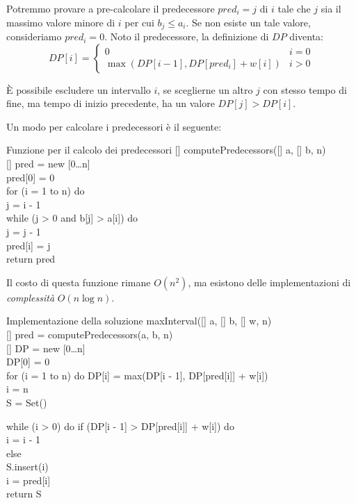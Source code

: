 Potremmo provare a pre-calcolare il predecessore $pred_i=j$ di $i$ tale che
$j$ sia il massimo valore minore di $i$ per cui $b_j\leq a_i$. Se non esiste un
tale valore, consideriamo $pred_i=0$. Noto il predecessore, la definizione di
$DP$ diventa:
\[DP[i]=\begin{cases}
    0 & i=0\\
    \max\left(DP[i-1],DP[pred_i]+w[i]\right) & i>0
\end{cases}\]
\begin{note}
    È possibile escludere un intervallo $i$, se sceglierne un altro $j$ con
    stesso tempo di fine, ma tempo di inizio precedente, ha un valore
    $DP[j]>DP[i]$.
\end{note}\noindent
Un modo per calcolare i predecessori è il seguente:

\begin{minicode}{Funzione per il calcolo dei predecessori}
\ind{}[]  computePredecessors([] a, [] b,  n)\\
    [] pred = new [0\dots n]\\
    pred[0] = 0\\
    \indf for (i = 1 to n) do\\
        j = i - 1\\
        \indff while (j > 0 and b[j] > a[i]) do\\
            j = j - 1\\
        \indff pred[i] = j\\
    \indf return pred
\end{minicode}\noindent
Il costo di questa funzione rimane $O(n^2)$, ma esistono delle implementazioni
di \emph{complessità} $O(n\log n)$.

\begin{minicode}{Implementazione della soluzione}
\ind{} maxInterval([] a, [] b, [] w,  n)\\
    [] pred = computePredecessors(a, b, n)\\
    [] DP = new [0\dots n]\\
    DP[0] = 0\\
    \indf for (i = 1 to n) do\hfill{}
        DP[i] = max(DP[i - 1], DP[pred[i]] + w[i])\\
    \indf{} i = n\\
    \indf{} S = Set()\\
\end{minicode}
\begin{codecont}
    \indent while (i > 0) do\hfill{}
        \indf if (DP[i - 1] > DP[pred[i]] + w[i]) do\\
            \indff i = i - 1\\
    \rmindent\indent else\\
            \indff S.insert(i)\\
            \indff i = pred[i]\\
    \ind return S
\end{codecont}

